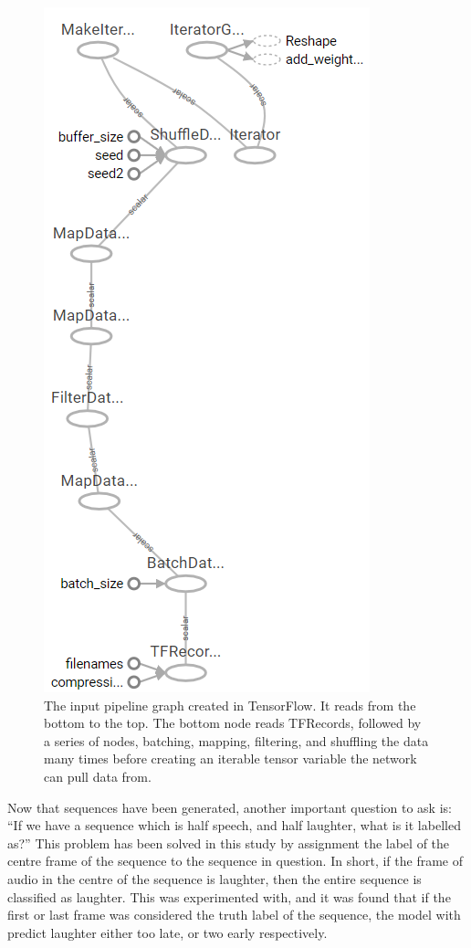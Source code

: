 \documentclass[a4paper,11pt,notitlepage]{article}
\begin{document}
\begin{figure}[H]
	\centering
	\vspace{0.5cm}
	\includegraphics[scale = 0.75]{figs/input_pipeline_graph.png}
	\caption{The input pipeline graph created in TensorFlow. It reads from the bottom to the top. The bottom node reads TFRecords, followed by a series of nodes, batching, mapping, filtering, and shuffling the data many times before creating an iterable tensor variable the network can pull data from.}
	\label{input_pipeline_graph}
\end{figure}

Now that sequences have been generated, another important question to ask is: ``If we have a sequence which is half speech, and half laughter, what is it labelled as?'' This problem has been solved in this study by assignment the label of the centre frame of the sequence to the sequence in question. In short, if the frame of audio in the centre of the sequence is laughter, then the entire sequence is classified as laughter. This was experimented with, and it was found that if the first or last frame was considered the truth label of the sequence, the model with predict laughter either too late, or two early respectively.
\end{document}
